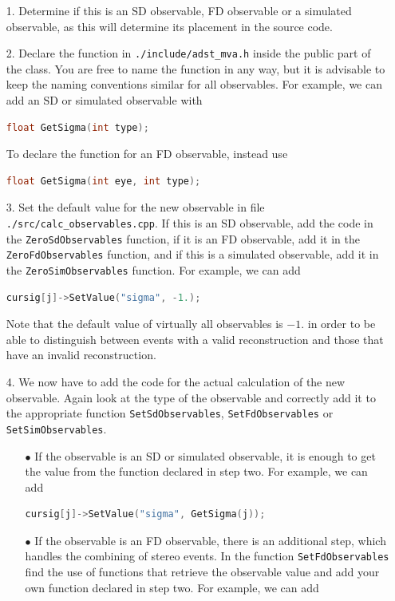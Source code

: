 \documentclass[12pt,a4paper]{report}
\begin{document}
\begin{itemize}
\item[1.] Determine if this is an SD observable, FD observable or a simulated observable, as this will determine its placement in the source code.
\item[2.] Declare the function in \texttt{./include/adst\_mva.h} inside the public part of the class. You are free to name the function in any way, but it is advisable to keep the naming conventions similar for all observables. For example, we can add an SD or simulated observable with
\begin{lstlisting}[language=C++]
  float GetSigma(int type);
\end{lstlisting}
To declare the function for an FD observable, instead use
\begin{lstlisting}[language=C++]
  float GetSigma(int eye, int type);
\end{lstlisting}
\item[3.] Set the default value for the new observable in file \texttt{./src/calc\_observables.cpp}. If this is an SD observable, add the code in the \texttt{ZeroSdObservables} function, if it is an FD observable, add it in the \texttt{ZeroFdObservables} function, and if this is a simulated observable, add it in the \texttt{ZeroSimObservables} function. For example, we can add
\begin{lstlisting}[language=C++]
  cursig[j]->SetValue("sigma", -1.);
\end{lstlisting}
Note that the default value of virtually all observables is $-1.$ in order to be able to distinguish between events with a valid reconstruction and those that have an invalid reconstruction.
\item[4.] We now have to add the code for the actual calculation of the new observable. Again look at the type of the observable and correctly add it to the appropriate function \texttt{SetSdObservables}, \texttt{SetFdObservables} or \texttt{SetSimObservables}.
\begin{itemize}
\item[$\bullet$] If the observable is an SD or simulated observable, it is enough to get the value from the function declared in step two. For example, we can add
\begin{lstlisting}[language=C++]
  cursig[j]->SetValue("sigma", GetSigma(j));
\end{lstlisting}
\item[$\bullet$] If the observable is an FD observable, there is an additional step, which handles the combining of stereo events. In the function \texttt{SetFdObservables} find the use of functions that retrieve the observable value and add your own function declared in step two. For example, we can add

\end{itemize}
\end{itemize}
\end{document}
